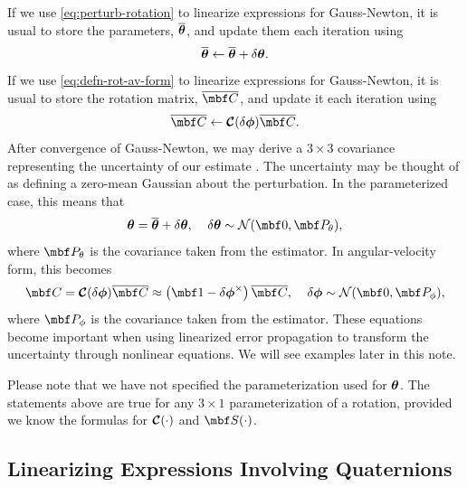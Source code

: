 \documentclass[11pt,a4,oneside]{article}
\begin{document}
If we use \eqref{eq:perturb-rotation} to linearize expressions for Gauss-Newton, it is usual to store the parameters, ${\overline{\boldsymbol{\theta}}}$, and update them each iteration using
\begin{equation}
  \label{eq:update-theta}
  {\overline{\boldsymbol{\theta}}} \leftarrow {\overline{\boldsymbol{\theta}}} + {\delta {\boldsymbol{\theta}}}.
\end{equation}
If we use \eqref{eq:defn-rot-av-form} to linearize expressions for Gauss-Newton, it is usual to store the rotation matrix, $\mbfbar C$, and update it each iteration using
\begin{equation}
  \label{eq:update-C}
  \mbfbar C \leftarrow \mbc C(\mbsdel \phi) \mbfbar C.
\end{equation}
After convergence of Gauss-Newton, we may derive a $3 \times 3$ covariance representing the uncertainty of our estimate \citep{Bell9300}. The uncertainty may be thought of as defining a zero-mean Gaussian about the perturbation. In the parameterized case, this means that
\begin{equation}
  \label{eq:gaussian-rot-parameters}
  \mbs \theta = \mbsbar \theta + \mbsdel \theta, \;\;\;\;\mbsdel \theta \sim \mathcal{N}(\mbf 0, \mbf P_{\theta}),
\end{equation}
where $\mbf P_{\theta}$ is the covariance taken from the estimator. In angular-velocity form, this becomes
\begin{equation}
  \label{eq:gaussian-av-form}
  \mbf C = \mbc C(\mbsdel \phi) \mbfbar C \approx \left( \mbf 1 - \mbsdel \phi^\times\right) \mbfbar C, \;\;\;\;\mbsdel \phi \sim \mathcal{N}(\mbf 0, \mbf P_{\phi}),
\end{equation}
where $\mbf P_{\phi}$ is the covariance taken from the estimator. These equations become important when using linearized error propagation to transform the uncertainty through nonlinear equations. We will see examples later in this note.

Please note that we have not specified the parameterization used for ${\boldsymbol{\theta}}$. The statements above are true for any $3 \times 1$ parameterization of a rotation, provided we know the formulas for ${{\boldsymbol{\mathcal{C}}}}(\cdot)$ and $\mbf S(\cdot)$.



\subsection{Linearizing Expressions Involving Quaternions\label{s:quat}}
\end{document}
